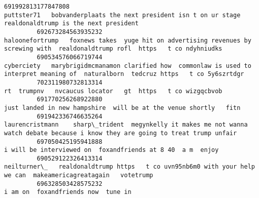 \documentclass[11pt]{article}
\begin{document}
\begin{Verbatim}[commandchars=\\\{\}]
         691992813177847808                                                                                                                                                                               puttster71   bobvanderplaats the next president isn t on ur stage   realdonaldtrump is the next president     
         692673284563935232                                                                                                                                                        haloonefortrump   foxnews takes  yuge hit on advertising revenues by screwing with  realdonaldtrump rofl  https   t co ndyhniudks    
         690534576066719744                                                                                                                                                  cyberciety   marybrigidmcmanamon clarified how  commonlaw is used to interpret meaning of  naturalborn  tedcruz https   t co 5y6szrtdgr    
         702311980732813314                                                                                                                                                                                                                              rt  trumpnv   nvcaucus locator   gt  https   t co wizgqcbvob   
         691770256268922880                                                                                                                                                                                                                         just landed in new hampshire  will be at the venue shortly   fitn   
         691942336746635264                                                                                                                                                      laurencristmann    sharp\_trident  megynkelly it makes me not wanna watch debate because i know they are going to treat trump unfair    
         697050425195941888                                                                                                                                                                                                                              i will be interviewed on  foxandfriends at 8 40  a m  enjoy    
         690529122326413314                                                                                                                                                                           neilturner\_   realdonaldtrump https   t co uvn95nb6m0 with your help we can  makeamericagreatagain   votetrump    
         696328503428575232                                                                                                                                                                                                                                                      i am on  foxandfriends now  tune in    

\end{Verbatim}
\end{document}
